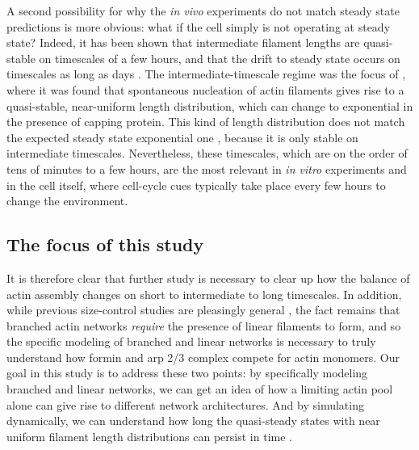 \documentclass[11pt]{article}
\newcommand{\red}[1]{\color{red}#1\normalcolor}
\begin{document}
A second possibility for why the \emph{in vivo} experiments do not match steady state predictions is more obvious: what if the cell simply is not operating at steady state? Indeed, it has been shown that intermediate filament lengths are quasi-stable on timescales of a few hours, and that the drift to steady state occurs on timescales as long as days \cite{hu2007theoretical,suarez2017enough}. The intermediate-timescale regime was the focus of \cite{banerjee2022emergence}, where it was found that spontaneous nucleation of actin filaments gives rise to a quasi-stable, near-uniform length distribution, which can change to exponential in the presence of capping protein. This kind of length distribution does not match the expected steady state exponential one \cite{edelstein1998models}, because it is only stable on intermediate timescales. Nevertheless, these timescales, which are on the order of tens of minutes to a few hours, are the most relevant in \emph{in vitro} experiments and in the cell itself, where cell-cycle cues typically take place every few hours to change the environment. 


\subsection{The focus of this study}
It is therefore clear that further study is necessary to clear up how the balance of actin assembly changes on short to intermediate to long timescales. In addition, while previous size-control studies are pleasingly general \cite{banerjee2022size, mohapatra2017limiting}, the fact remains that branched actin networks \emph{require} the presence of linear filaments to form, and so the specific modeling of branched and linear networks is necessary to truly understand how formin and arp 2/3 complex compete for actin monomers. Our goal in this study is to address these two points: by specifically modeling branched and linear networks, we can get an idea of how a limiting actin pool alone can give rise to different network architectures. And by simulating dynamically, we can understand how long the quasi-steady states with near uniform filament length distributions can persist in time \cite{banerjee2022emergence}. 
\end{document}
